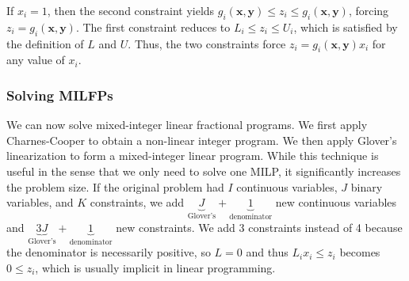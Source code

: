 \documentclass[11pt, oneside]{article}
\theoremstyle{plain}
\theoremstyle{definition}
\begin{document}
If \( x_i = 1 \), then the second constraint yields \( g_i(\bm{x}, \bm{y}) \leq
z_i \leq g_i(\bm{x}, \bm{y}) \), forcing \( z_i = g_i(\bm{x}, \bm{y}) \). The
first constraint reduces to \( L_i \leq z_i \leq U_i \), which is satisfied by
the definition of \( L \) and \( U \). Thus, the two constraints force \( z_i =
g_i(\bm{x}, \bm{y}) x_i \) for any value of \( x_i \).

\subsubsection{Solving MILFPs}
We can now solve mixed-integer linear fractional programs. We first apply
Charnes-Cooper to obtain a non-linear integer program. We then apply Glover's
linearization to form a mixed-integer linear program. While this technique
is useful in the sense that we only need to solve one MILP, it significantly
increases the problem size. If the original problem had \( I \) continuous
variables, \( J \) binary variables, and \( K \) constraints, we add \(
\underbrace{J}_{\text{Glover's}} + \underbrace{1}_{\text{denominator}}
\) new continuous variables and \( \underbrace{3J}_{\text{Glover's}} +
\underbrace{1}_{\text{denominator}} \) new constraints. We add 3 constraints
instead of 4 because the denominator is necessarily positive, so \( L = 0 \)
and thus \( L_i x_i \leq z_i \) becomes \( 0 \leq z_i \), which is usually
implicit in linear programming.
\end{document}
